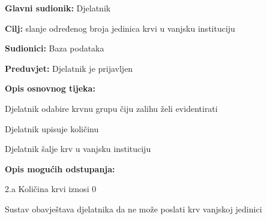 \documentclass[11pt]{book}
\begin{document}
\noindent {}
					\begin{packed_item}
	
						\item \textbf{Glavni sudionik: }Djelatnik
						\item \textbf{Cilj:} slanje određenog broja jedinica krvi u vanjsku instituciju
						\item \textbf{Sudionici:} Baza podataka
						\item \textbf{Preduvjet:} Djelatnik je prijavljen
						\item \textbf{Opis osnovnog tijeka:}
						
						\item[] \begin{packed_enum}
	
							\item Djelatnik odabire krvnu grupu čiju zalihu želi evidentirati
							\item Djelatnik upisuje količinu
							\item Djelatnik šalje krv u vanjsku instituciju
						\end{packed_enum}
						\item  \textbf{Opis mogućih odstupanja:}
						
						\item[] \begin{packed_item}
	
							\item[2.a] Količina krvi iznosi 0
							\item[] \begin{packed_enum}
								
								\item  Sustav obavještava djelatnika da ne može poslati krv vanjskoj jedinici

								
							\end{packed_enum}
					\end{packed_item}
					\end{packed_item}
\end{document}

